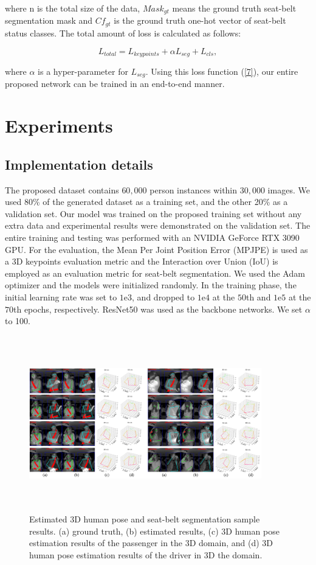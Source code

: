 \documentclass[letterpaper]{article} %
\begin{document}
\noindent where n is the total size of the data, ${Mask}_{gt}$ means the ground truth seat-belt segmentation mask and ${Cf}_{gt}$ is the ground truth one-hot vector of seat-belt status classes.
The total amount of loss is calculated as follows:

\begin{equation} \label{7}
{{L}_{total} = {L}_{keypoints} + \alpha{L}_{seg} + {L}_{cls}},
\end{equation}

\noindent where $\alpha$ is a hyper-parameter for ${L}_{seg}$. Using this loss function (\ref{7}), our entire proposed network can be trained in an end-to-end manner.

\section{Experiments}
\subsection{Implementation details}
The proposed dataset contains $60,000$ person instances within $30,000$ images. We used 80\% of the generated dataset as a training set, and the other 20\% as a validation set. Our model was trained on the proposed training set without any extra data and experimental results were demonstrated on the validation set. The entire training and testing was performed with an NVIDIA GeForce RTX 3090 GPU. For the evaluation, the Mean Per Joint Position Error (MPJPE) is used as a 3D keypoints evaluation metric and the Interaction over Union (IoU) is employed as an evaluation metric for seat-belt segmentation. We used the Adam optimizer \cite{kingma2014adam} and the models were initialized randomly. In the training phase, the initial learning rate was set to $1$e\textminus$3$, and dropped to $1$e\textminus$4$ at the $50$th and $1$e\textminus$5$ at the $70$th epochs, respectively. ResNet50 \cite{he2016identity} was used as the backbone networks. We set $\alpha$ to 100.


\begin{figure}[t]
\centering
\includegraphics[width=0.9\textwidth,height=3.0in ]{LaTeX/images/qul.png}
\caption{Estimated 3D human pose and seat-belt segmentation sample results. (a) ground truth, (b) estimated results, (c) 3D human pose estimation results of the passenger in the 3D domain, and (d) 3D human pose estimation results of the driver in 3D the domain.}
\label{fig:qualitivity}
\end{figure}
\end{document}
